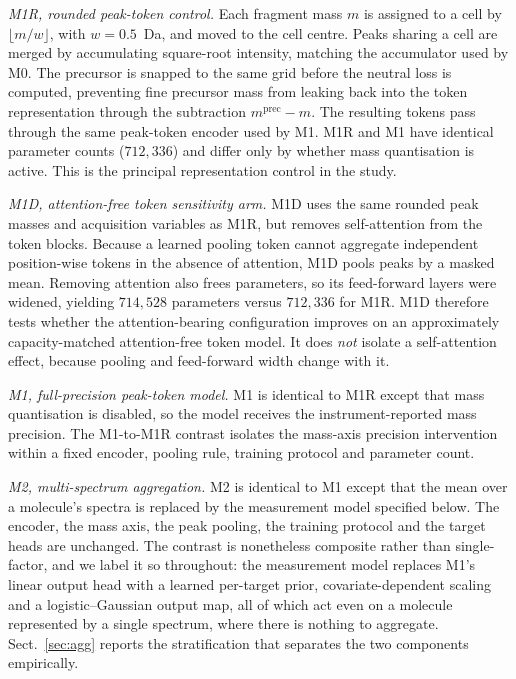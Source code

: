 \documentclass[11pt]{article}
\begin{document}
\emph{M1R, rounded peak-token control.} Each fragment mass $m$ is assigned to a cell by $\lfloor m/w \rfloor$, with $w=0.5$~Da, and moved to the cell centre. Peaks sharing a cell are merged by accumulating square-root intensity, matching the accumulator used by M0. The precursor is snapped to the same grid before the neutral loss is computed, preventing fine precursor mass from leaking back into the token representation through the subtraction $m^{\mathrm{prec}}-m$. The resulting tokens pass through the same peak-token encoder used by M1. M1R and M1 have identical parameter counts ($712{,}336$) and differ only by whether mass quantisation is active. This is the principal representation control in the study.

\emph{M1D, attention-free token sensitivity arm.} M1D uses the same rounded peak masses and acquisition variables as M1R, but removes self-attention from the token blocks. Because a learned pooling token cannot aggregate independent position-wise tokens in the absence of attention, M1D pools peaks by a masked mean. Removing attention also frees parameters, so its feed-forward layers were widened, yielding $714{,}528$ parameters versus $712{,}336$ for M1R. M1D therefore tests whether the attention-bearing configuration improves on an approximately capacity-matched attention-free token model. It does \emph{not} isolate a self-attention effect, because pooling and feed-forward width change with it.

\emph{M1, full-precision peak-token model.} M1 is identical to M1R except that mass quantisation is disabled, so the model receives the instrument-reported mass precision. The M1-to-M1R contrast isolates the mass-axis precision intervention within a fixed encoder, pooling rule, training protocol and parameter count.

\emph{M2, multi-spectrum aggregation.} M2 is identical to M1 except that the mean over a molecule's spectra is replaced by the measurement model specified below. The encoder, the mass axis, the peak pooling, the training protocol and the target heads are unchanged. The contrast is nonetheless composite rather than single-factor, and we label it so throughout: the measurement model replaces M1's linear output head with a learned per-target prior, covariate-dependent scaling and a logistic--Gaussian output map, all of which act even on a molecule represented by a single spectrum, where there is nothing to aggregate. Sect.~\ref{sec:agg} reports the stratification that separates the two components empirically.
\end{document}

